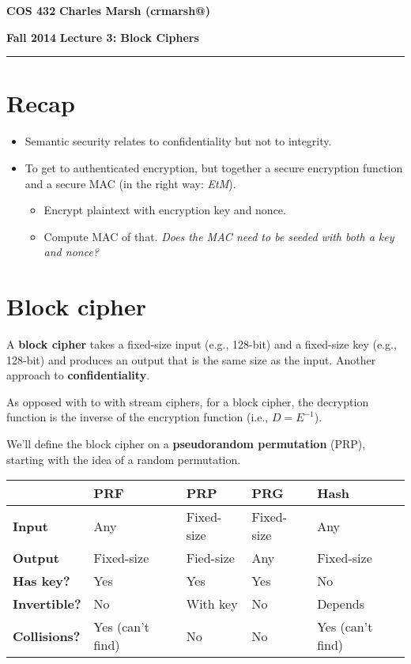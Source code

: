 \documentclass[12pt]{article}
\makeatletter
\newcommand{\myheader}[4]
{\vspace*{-0.5in}
\noindent
{#1} \hfill {#3}

\noindent
{#2} \hfill {#4}

\noindent
\rule[8pt]{\textwidth}{1pt}

\vspace{1ex} 
}  %
\newcommand{\myalgsheader}[0]
{\myheader
{ {\bf{COS 432}} }
{ {\bf{Fall 2014}} }
{ {\bf{Charles Marsh (crmarsh@)}} }
{ {\bf{Lecture 3: Block Ciphers}} }
}
\makeatother
\begin{document}
\myalgsheader

\pagestyle{plain}

\section*{Recap}

\begin{itemize}
\item Semantic security relates to confidentiality but not to integrity.
\item To get to authenticated encryption, but together a secure encryption function and a secure MAC (in the right way: \textit{EtM}).
\begin{itemize}
\item Encrypt plaintext with encryption key and nonce.
\item Compute MAC of that. \textit{Does the MAC need to be seeded with both a key and nonce?}
\end{itemize}
\end{itemize}

\section*{Block cipher}

A \textbf{block cipher} takes a fixed-size input (e.g., 128-bit) and a fixed-size key (e.g., 128-bit) and produces an output that is the same size as the input. Another approach to \textbf{confidentiality}.

As opposed with to with stream ciphers, for a block cipher, the decryption function is the inverse of the encryption function (i.e., $D = E^{-1}$).

We'll define the block cipher on a \textbf{pseudorandom permutation} (PRP), starting with the idea of a random permutation.

\begin{center}
    \begin{tabular}{| l | l | l | l | l |}
    \hline
     & \textbf{PRF} & \textbf{PRP} & \textbf{PRG} & \textbf{Hash} \\ \hline
    \textbf{Input} & Any & Fixed-size & Fixed-size & Any \\ \hline
    \textbf{Output} & Fixed-size & Fied-size & Any & Fixed-size \\ \hline
    \textbf{Has key?} & Yes & Yes & Yes & No \\ \hline
    \textbf{Invertible?} & No & With key & No & Depends \\ \hline
    \textbf{Collisions?} & Yes (can't find) & No & No & Yes (can't find) \\ \hline
    \end{tabular}
\end{center}
\end{document}
